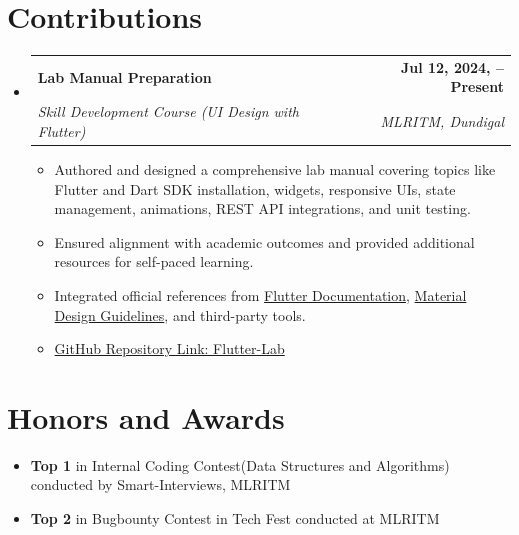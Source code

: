 \documentclass[a4paper,11pt]{article}
\makeatletter
\newcommand{\resumeItem}[1]{
  \item\small{
    {#1 \vspace{-2pt}}
  }
}
\newcommand{\resumeSubheading}[4]{
  \vspace{-2pt}\item
    \begin{tabular*}{0.97\textwidth}[t]{l@{\extracolsep{\fill}}r}
      \textbf{#1} & \textbf{\small #2} \\
      \textit{\small#3} & \textit{\small #4} \\
    \end{tabular*}\vspace{-7pt}
}
\newcommand{\resumeSubHeadingListStart}{\begin{itemize}[leftmargin=0.15in, label={}]}
\newcommand{\resumeSubHeadingListEnd}{\end{itemize}}
\newcommand{\resumeItemListStart}{\begin{itemize}}
\newcommand{\resumeItemListEnd}{\end{itemize}\vspace{-5pt}}
\makeatother
\begin{document}
\section{Contributions}
  \resumeSubHeadingListStart
    \resumeSubheading
      {Lab Manual Preparation}{Jul 12, 2024, -- Present}
      {Skill Development Course (UI Design with Flutter)}{MLRITM, Dundigal}
      \resumeItemListStart
        \resumeItem{Authored and designed a comprehensive lab manual covering topics like Flutter and Dart SDK installation, widgets, responsive UIs, state management, animations, REST API integrations, and unit testing.}
        \resumeItem{Ensured alignment with academic outcomes and provided additional resources for self-paced learning.}
        \resumeItem{Integrated official references from \href{https://flutter.dev}{Flutter Documentation}, \href{https://material.io}{Material Design Guidelines}, and third-party tools.}
          \resumeItem{\href{https://github.com/srinu2003/Flutter-Lab}{GitHub Repository Link: Flutter-Lab}}
              \resumeItemListEnd
          \resumeSubHeadingListEnd

\vspace{-11pt}
\section{Honors and Awards}
  \resumeItemListStart[parsep = -2pt]
    \resumeItem{\textbf{Top 1} in Internal Coding Contest(Data Structures and Algorithms) conducted by Smart-Interviews, MLRITM}
    \resumeItem{\textbf{Top 2} in Bugbounty Contest in Tech Fest conducted at MLRITM}
  \resumeItemListEnd

\end{document}
